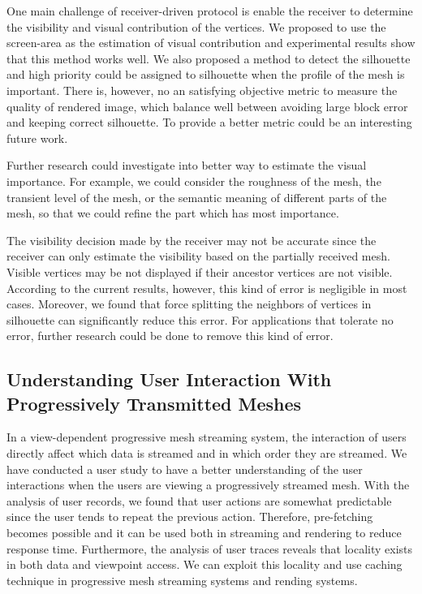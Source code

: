 One main challenge of receiver-driven protocol is enable the receiver
to determine the visibility and visual contribution of the vertices.
We proposed to use the screen-area as the estimation of visual contribution and 
experimental results show that this method works well. 
We also proposed a method
to detect the silhouette and high priority could be assigned to silhouette when the
profile of the mesh is important. 
There is, however, no an satisfying objective metric to measure the quality
of rendered image, which balance well between avoiding large block error and 
keeping correct silhouette. To provide a better metric could be an interesting 
future work. 

Further research could investigate into better way to estimate the visual importance.
For example, we could consider the roughness of the mesh, the transient level of the mesh,
or the semantic meaning of different parts of the mesh, so that we could refine 
the part which has most importance.

The visibility decision made by the receiver may not be accurate 
since the receiver can only estimate the visibility based on
the partially received mesh. 
Visible vertices may be not displayed if their ancestor vertices are not visible. 
According to the current results, however, this kind of error is negligible in most cases. 
Moreover, we found that force splitting the neighbors of vertices in silhouette can significantly reduce this error.
For applications that tolerate no error, 
further research could be done to remove this kind of error. 

\subsection{Understanding User Interaction With Progressively Transmitted Meshes} 
In a view-dependent progressive mesh streaming system, the interaction of users directly
affect which data is streamed and in which order they are streamed.
We have conducted a user study to have a better understanding of the user interactions when the users are 
viewing a progressively streamed mesh.
With the analysis of user records, we found that user actions are 
somewhat predictable since the user tends to repeat the previous 
action. 
Therefore, pre-fetching becomes possible and it can be used both in streaming and rendering to
reduce response time.
Furthermore, the analysis of user traces reveals that locality exists in both data and viewpoint access. 
We can exploit this locality and use caching technique in progressive mesh streaming systems and rending systems.

